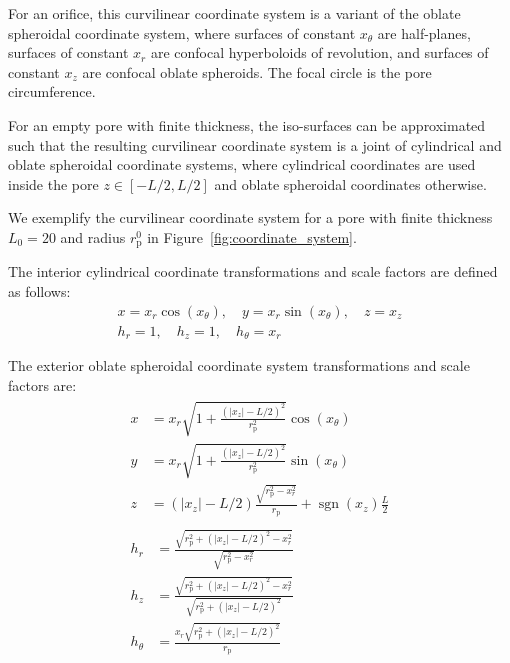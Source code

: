 \documentclass[10pt, a4paper]{article}
\begin{document}
\begin{multicols}{2}
For an orifice, this curvilinear coordinate system is a variant of the oblate spheroidal coordinate system, where surfaces of constant $x_{\theta}$ are half-planes, surfaces of constant $x_{r}$ are confocal hyperboloids of revolution, and surfaces of constant $x_{z}$ are confocal oblate spheroids.
The focal circle is the pore circumference.

For an empty pore with finite thickness, the iso-surfaces can be approximated such that the resulting curvilinear coordinate system is a joint of cylindrical and oblate spheroidal coordinate systems,
where cylindrical coordinates are used inside the pore $z \in [-L/2, L/2]$ and oblate spheroidal coordinates otherwise.

We exemplify the curvilinear coordinate system for a pore with finite thickness $L_{0} = 20$ and radius $r_{\text{p}}^{0}$ in Figure~\ref{fig:coordinate_system}.

The interior cylindrical coordinate transformations and scale factors are defined as follows:
\begin{gather}
    \label{eq:cyl_transformation_1}
    x = x_r \cos(x_{\theta}), \quad
    y = x_r \sin(x_{\theta}), \quad
    z = x_z
    \\
    \label{eq:cyl_transformation_2}
    h_r = 1, \quad
    h_z = 1, \quad
    h_{\theta} = x_r
\end{gather}

The exterior oblate spheroidal coordinate system transformations and scale factors are:
\begin{gather}
    \begin{aligned}\label{eq:oblate_spheroid_transformation_1}
        x &= x_r
        \sqrt{1 + \frac{(|x_z| - L/2)^2}{r_{\text{p}}^2}}
        \cos(x_{\theta})
        \\
        y &= x_r
        \sqrt{1 + \frac{(|x_z| - L/2)^2}{r_{\text{p}}^2}}
        \sin(x_{\theta})
        \\
        z &= (|x_z| - L/2) \frac{\sqrt{r_{\text{p}}^2 - x_r^2}}{r_{\text{p}}} + \operatorname{sgn}(x_z) \frac{L}{2}
    \end{aligned}
    \\[4pt]
    \begin{aligned}\label{eq:oblate_spheroid_transformation_2}
        h_r &= \frac{\sqrt{r_{\text{p}}^2 + (|x_z| - L/2)^2 - x_r^2}}{\sqrt{r_{\text{p}}^2 - x_r^2}}
        \\
        h_z &= \frac{\sqrt{r_{\text{p}}^2 + (|x_z| - L/2)^2 - x_r^2}}{\sqrt{r_{\text{p}}^2 + (|x_z| - L/2)^2}}
        \\
        h_{\theta} &= \frac{x_r \sqrt{r_{\text{p}}^2 + (|x_z| - L/2)^2}}{r_{\text{p}}}
    \end{aligned}
\end{gather}


\end{multicols}
\end{document}
